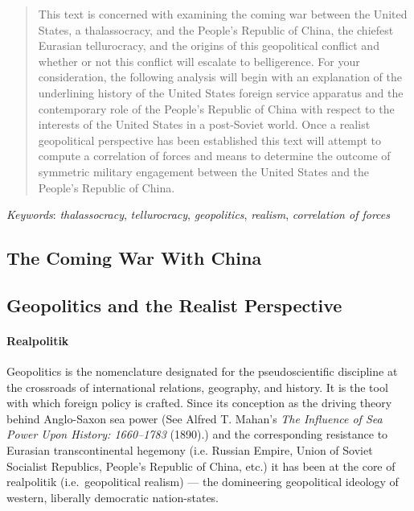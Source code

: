 \documentclass[12pt]{article}
\date{}
\author{\normalsize \textbf{The Coming War With China}\\\normalsize  \textsc{Michael D. Brodskiy}\\\normalsize  Department of Political Science, Diablo Valley College\\\normalsize  POLSC-250: International Relations\\\normalsize  Professor Kropf\\\normalsize  July 22, 2021}
\begin{document}
\maketitle

\newpage

\begin{abstract}
  \hspace{-17.5pt}This text is concerned with examining the coming war between the United States, a thalassocracy, and the People's Republic of China, the chiefest Eurasian tellurocracy, and the origins of this geopolitical conflict and whether or not this conflict will escalate to belligerence. For your consideration, the following analysis will begin with an explanation of the underlining history of the United States foreign service apparatus and the contemporary role of the People's Republic of China with respect to the interests of the United States in a post-Soviet world. Once a realist geopolitical perspective has been established this text will attempt to compute a correlation of forces and means to determine the outcome of symmetric military engagement between the United States and the People's Republic of China. 
\end{abstract}

\emph{Keywords}: \textit{thalassocracy}, \textit{tellurocracy}, \textit{geopolitics}, \textit{realism}, \textit{correlation of forces}

\newpage

\tableofcontents
\listoffigures

\newpage

\begin{center}
\section{\normalsize The Coming War With China}
\end{center}

\begin{center}
\subsection{\normalsize Geopolitics and the Realist Perspective}
\end{center}
\paragraph{Realpolitik} Geopolitics is the nomenclature designated for the pseudoscientific discipline at the crossroads of international relations, geography, and history. It is the tool with which foreign policy is crafted. Since its conception as the driving theory behind Anglo-Saxon sea power (See Alfred T. Mahan's \emph{The Influence of Sea Power Upon History: 1660–1783} (1890).) and the corresponding resistance to Eurasian transcontinental hegemony (i.e. Russian Empire, Union of Soviet Socialist Republics, People's Republic of China, etc.) it has been at the core of realpolitik (i.e.\ geopolitical realism) — the domineering geopolitical ideology of western, liberally democratic nation-states.
\end{document}
